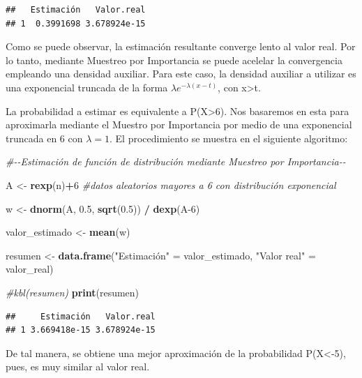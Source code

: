 \documentclass[
]{article}
\newenvironment{Shaded}{\begin{snugshade}}{\end{snugshade}}
\newcommand{\CommentTok}[1]{\textcolor[rgb]{0.56,0.35,0.01}{\textit{#1}}}
\newcommand{\DecValTok}[1]{\textcolor[rgb]{0.00,0.00,0.81}{#1}}
\newcommand{\FloatTok}[1]{\textcolor[rgb]{0.00,0.00,0.81}{#1}}
\newcommand{\FunctionTok}[1]{\textcolor[rgb]{0.13,0.29,0.53}{\textbf{#1}}}
\newcommand{\NormalTok}[1]{#1}
\newcommand{\OtherTok}[1]{\textcolor[rgb]{0.56,0.35,0.01}{#1}}
\newcommand{\SpecialCharTok}[1]{\textcolor[rgb]{0.81,0.36,0.00}{\textbf{#1}}}
\newcommand{\StringTok}[1]{\textcolor[rgb]{0.31,0.60,0.02}{#1}}
\begin{document}
\begin{verbatim}
##   Estimación   Valor.real
## 1  0.3991698 3.678924e-15
\end{verbatim}

Como se puede observar, la estimación resultante converge lento al valor
real. Por lo tanto, mediante Muestreo por Importancia se puede acelelar
la convergencia empleando una densidad auxiliar. Para este caso, la
densidad auxiliar a utilizar es una exponencial truncada de la forma
\(\lambda e^{-\lambda(x-t)}\), con x\textgreater t.

La probabilidad a estimar es equivalente a P(X\textgreater6). Nos
basaremos en esta para aproximarla mediante el Muestro por Importancia
por medio de una exponencial truncada en 6 con \(\lambda = 1\). El
procedimiento se muestra en el siguiente algoritmo:

\begin{Shaded}
\begin{Highlighting}[]
\CommentTok{\#{-}{-}Estimación de función de distribución mediante Muestreo por Importancia{-}{-}}

\NormalTok{A }\OtherTok{\textless{}{-}} \FunctionTok{rexp}\NormalTok{(n)}\SpecialCharTok{+}\DecValTok{6} \CommentTok{\#datos aleatorios mayores a 6 con distribución exponencial}

\NormalTok{w }\OtherTok{\textless{}{-}} \FunctionTok{dnorm}\NormalTok{(A, }\FloatTok{0.5}\NormalTok{, }\FunctionTok{sqrt}\NormalTok{(}\FloatTok{0.5}\NormalTok{)) }\SpecialCharTok{/} \FunctionTok{dexp}\NormalTok{(A}\DecValTok{{-}6}\NormalTok{)}

\NormalTok{valor\_estimado }\OtherTok{\textless{}{-}} \FunctionTok{mean}\NormalTok{(w)}

\NormalTok{resumen }\OtherTok{\textless{}{-}} \FunctionTok{data.frame}\NormalTok{(}\StringTok{"Estimación"} \OtherTok{=}\NormalTok{ valor\_estimado, }\StringTok{"Valor real"} \OtherTok{=}\NormalTok{ valor\_real)}

\CommentTok{\#kbl(resumen)}
\FunctionTok{print}\NormalTok{(resumen)}
\end{Highlighting}
\end{Shaded}

\begin{verbatim}
##     Estimación   Valor.real
## 1 3.669418e-15 3.678924e-15
\end{verbatim}

De tal manera, se obtiene una mejor aproximación de la probabilidad
P(X\textless-5), pues, es muy similar al valor real.
\end{document}
